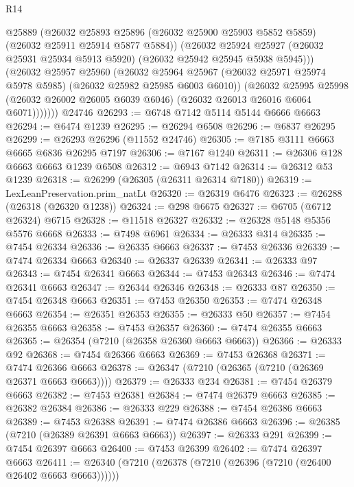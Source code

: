\begin{lexlean}{R14}
\begin{coremodule}
{{{{{{{{{{{{{{{{{{{{{{{{{{{{{{{{{{{{{{{{{{{{{{{{{{{{{{{{{{{{{{{{{{{{{{{{{{{{{{{{{{              @25889
              (@26032
                @25893
                @25896
                (@26032 @25900 @25903 @5852 @5859)
                (@26032 @25911 @25914 @5877 @5884))
              (@26032
                @25924
                @25927
                (@26032 @25931 @25934 @5913 @5920)
                (@26032 @25942 @25945 @5938 @5945)))
            (@26032
              @25957
              @25960
              (@26032
                @25964
                @25967
                (@26032 @25971 @25974 @5978 @5985)
                (@26032 @25982 @25985 @6003 @6010))
              (@26032
                @25995
                @25998
                (@26032 @26002 @26005 @6039 @6046)
                (@26032 @26013 @26016 @6064 @6071)))))))
    @24746
@26293 := @6748 @7142 @5114 @5144 @6666 @6663
@26294 := @6474 @1239
@26295 := @26294 @6508
@26296 := @6837 @26295
@26299 := @26293 @26296 (@11552 @24746)
@26305 := @7185 @3111 @6663 @6665 @6836 @26295 @7197
@26306 := @7167 @1240
@26311 := @26306 @128 @6663 @6663 @1239 @6508
@26312 := @6943 @7142
@26314 := @26312 @53 @1239
@26318 := @26299 (@26305 (@26311 @26314 @7180))
@26319 := LexLeanPreservation.prim_natLt
@26320 := @26319 @6476
@26323 := @26288 (@26318 (@26320 @1238))
@26324 := @298 @6675
@26327 := @6705 (@6712 @26324) @6715
@26328 := @11518 @26327
@26332 := @26328 @5148 @5356 @5576 @6668
@26333 := @7498 @6961
@26334 := @26333 @314
@26335 := @7454 @26334
@26336 := @26335 @6663
@26337 := @7453 @26336
@26339 := @7474 @26334 @6663
@26340 := @26337 @26339
@26341 := @26333 @97
@26343 := @7454 @26341 @6663
@26344 := @7453 @26343
@26346 := @7474 @26341 @6663
@26347 := @26344 @26346
@26348 := @26333 @87
@26350 := @7454 @26348 @6663
@26351 := @7453 @26350
@26353 := @7474 @26348 @6663
@26354 := @26351 @26353
@26355 := @26333 @50
@26357 := @7454 @26355 @6663
@26358 := @7453 @26357
@26360 := @7474 @26355 @6663
@26365 := @26354 (@7210 (@26358 @26360 @6663 @6663))
@26366 := @26333 @92
@26368 := @7454 @26366 @6663
@26369 := @7453 @26368
@26371 := @7474 @26366 @6663
@26378 := @26347 (@7210 (@26365 (@7210 (@26369 @26371 @6663 @6663))))
@26379 := @26333 @234
@26381 := @7454 @26379 @6663
@26382 := @7453 @26381
@26384 := @7474 @26379 @6663
@26385 := @26382 @26384
@26386 := @26333 @229
@26388 := @7454 @26386 @6663
@26389 := @7453 @26388
@26391 := @7474 @26386 @6663
@26396 := @26385 (@7210 (@26389 @26391 @6663 @6663))
@26397 := @26333 @291
@26399 := @7454 @26397 @6663
@26400 := @7453 @26399
@26402 := @7474 @26397 @6663
@26411 := @26340 (@7210 (@26378 (@7210 (@26396 (@7210 (@26400 @26402 @6663 @6663))))))
}}}}}}}}}}}}}}}}}}}}}}}}}}}}}}}}}}}}}}}}}}}}}}}}}}}}}}}}}}}}}}}}}}}}}}}}}}}}}}}}}}
\end{coremodule}
\end{lexlean}
